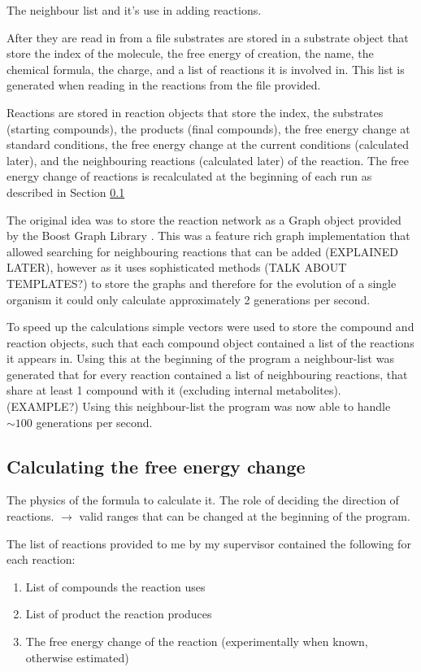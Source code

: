 \documentclass[10pt,a4paper]{article}
\begin{document}
The neighbour list and it's use in adding reactions.



	After they are read in from a file substrates are stored in a substrate object that store the index of the molecule, the free energy of creation, the name, the chemical formula, the charge, and a list of reactions it is involved in. This list is generated when reading in the reactions from the file provided.
	
	Reactions are stored in reaction objects that store the index, the substrates  (starting compounds), the products  (final compounds), the free energy change at standard conditions, the free energy change at the current conditions (calculated later), and the neighbouring reactions (calculated later) of the reaction. The free energy change of reactions is recalculated at the beginning of each run as described in Section \ref{sub:The free energy change}
	
	The original idea was to store the reaction network as a Graph object provided by the Boost Graph Library \cite{boostlibraries}. This was a feature rich graph implementation that allowed searching for neighbouring reactions that can be added (EXPLAINED LATER), however as it uses sophisticated methods (TALK ABOUT TEMPLATES?) to store the  graphs and therefore for the evolution of a single organism it could only calculate approximately 2 generations per second. 
	
	To speed up the calculations simple vectors were used to store the compound and reaction objects, such that each compound object contained a list of the reactions it appears in. Using this at the beginning of the program a neighbour-list was generated that for every reaction contained a list of neighbouring reactions, that share at least 1 compound with it (excluding internal metabolites). (EXAMPLE?) Using this neighbour-list the program was now able to handle $\sim 100$ generations per second. 
\subsection{Calculating the free energy change}
\label{sub:The free energy change}
The physics of the formula to calculate it. The role of deciding the direction of reactions.  $\rightarrow$ valid ranges  that can be changed at the beginning of the program.



	The list of reactions provided to me by my supervisor contained the following for each reaction: 
	\begin{enumerate}
		\item List of compounds the reaction uses
		\item List of product the reaction produces
		\item The free energy change of the reaction (experimentally when known, otherwise estimated) \cite{BartekLower}
	\end{enumerate}
	
\end{document}
